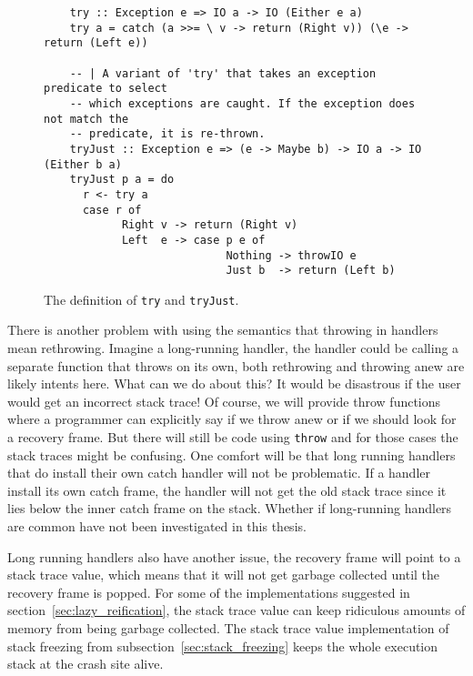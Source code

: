 \begin{figure}
\begin{mdframed}
  \begin{verbatim}
    try :: Exception e => IO a -> IO (Either e a)
    try a = catch (a >>= \ v -> return (Right v)) (\e -> return (Left e))

    -- | A variant of 'try' that takes an exception predicate to select
    -- which exceptions are caught. If the exception does not match the
    -- predicate, it is re-thrown.
    tryJust :: Exception e => (e -> Maybe b) -> IO a -> IO (Either b a)
    tryJust p a = do
      r <- try a
      case r of
            Right v -> return (Right v)
            Left  e -> case p e of
                            Nothing -> throwIO e
                            Just b  -> return (Left b)
  \end{verbatim}
  \caption{The definition of \texttt{try} and \texttt{tryJust}.}
  \label{fig:try_just}
\end{mdframed}
\end{figure}

There is another problem with using the semantics that throwing in
handlers mean rethrowing. Imagine a long-running handler, the handler
could be calling a separate function that throws on its own, both
rethrowing and throwing anew are likely intents here. What can we
do about this? It would be disastrous if the
user would get an incorrect stack trace! Of course, we will provide
throw functions where a programmer can explicitly say if we throw anew
or if we should look for a recovery frame. But there will still be code
using \texttt{throw} and for those cases the stack traces might be
confusing. One comfort will be that long running handlers that do
install their own catch handler will not be problematic. If a handler install its
own catch frame, the handler will not get the old stack trace
since it lies below the inner catch frame on the stack.
Whether if long-running handlers are common have not been investigated
in this thesis.

Long running handlers also have another issue, the
recovery frame will point to a stack trace value, which means that it
will not get garbage collected until the recovery frame is
popped. For some of the implementations suggested in section~\ref{sec:lazy_reification}, the stack trace value can keep ridiculous
amounts of memory from being garbage collected. The stack trace value
implementation of stack freezing from subsection~\ref{sec:stack_freezing} keeps the whole execution stack at the crash
site alive.

